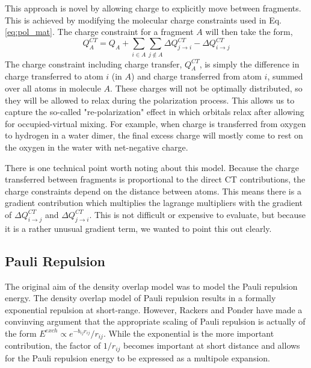 \documentclass[journal=jacsat,manuscript=article]{achemso}
\begin{document}
This approach is novel by allowing charge to explicitly move between
fragments. This is achieved by modifying the molecular charge constraints used in Eq. \ref{eq:pol_mat}.
The charge constraint for a fragment $A$ will then take the form,
\begin{equation}
  Q^{CT}_A=Q_A+\sum_{i\in A}\sum_{j\notin A}\Delta Q^{CT}_{j\rightarrow i}-\Delta Q^{CT}_{i\rightarrow j}
  \label{eq:charge_constraint}
\end{equation}
The charge constraint including charge transfer, $Q^{CT}_A$, is simply the
difference in charge transferred to atom $i$ (in $A$) and charge transferred from atom
$i$, summed over all atoms in molecule $A$. These charges will not be optimally
distributed, so they will be allowed to relax during the polarization process.
This allows us to capture the so-called "re-polarization"\cite{khaliullin2007unravelling}
effect in which orbitals relax after allowing for occupied-virtual mixing.
For example, when charge is transferred from oxygen to hydrogen in a water
dimer, the final excess charge will mostly come to rest on the oxygen in
the water with net-negative charge.

There is one technical point worth noting about this model. Because the
charge transferred between fragments is proportional to the direct CT contributions,
the charge constraints depend on the distance between atoms. This means there
is a gradient contribution which multiplies the lagrange multipliers
with the gradient of $\Delta Q^{CT}_{i\rightarrow j}$ and $\Delta Q^{CT}_{j\rightarrow i}$.
This is not difficult or expensive to evaluate, but because it is a rather
unusual gradient term, we wanted to point this out clearly.

\subsection*{Pauli Repulsion}
The original aim of the density overlap model was to model the
Pauli repulsion energy.\cite{wallqvist1989new,wheatley1990overlap,gordon1996approximate}
The density overlap model of Pauli repulsion results in a formally exponential
repulsion at short-range.
However, Rackers and Ponder have made a convinving argument that the appropriate
scaling of Pauli repulsion is actually of the form $E^{exch}\propto e^{-b_{ij}r_{ij}}/r_{ij}$.\cite{rackers2019classical,rackers2021polarizable}
While the exponential is the more important contribution, the factor of $1/r_{ij}$
becomes important at short distance and allows for the Pauli repulsion energy
to be expressed as a multipole expansion.
\end{document}
